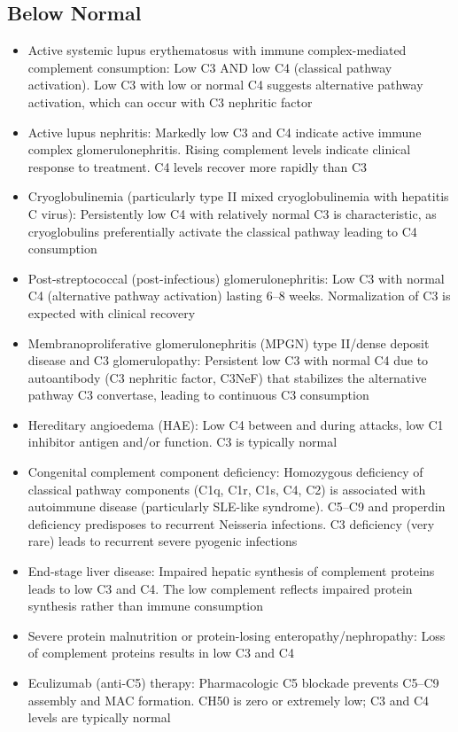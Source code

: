 \subsection*{Below Normal}
\begin{itemize}
  \item Active systemic lupus erythematosus with immune complex-mediated complement consumption: Low C3 AND low C4 (classical pathway activation). Low C3 with low or normal C4 suggests alternative pathway activation, which can occur with C3 nephritic factor
  \item Active lupus nephritis: Markedly low C3 and C4 indicate active immune complex glomerulonephritis. Rising complement levels indicate clinical response to treatment. C4 levels recover more rapidly than C3
  \item Cryoglobulinemia (particularly type II mixed cryoglobulinemia with hepatitis C virus): Persistently low C4 with relatively normal C3 is characteristic, as cryoglobulins preferentially activate the classical pathway leading to C4 consumption
  \item Post-streptococcal (post-infectious) glomerulonephritis: Low C3 with normal C4 (alternative pathway activation) lasting 6--8 weeks. Normalization of C3 is expected with clinical recovery
  \item Membranoproliferative glomerulonephritis (MPGN) type II/dense deposit disease and C3 glomerulopathy: Persistent low C3 with normal C4 due to autoantibody (C3 nephritic factor, C3NeF) that stabilizes the alternative pathway C3 convertase, leading to continuous C3 consumption
  \item Hereditary angioedema (HAE): Low C4 between and during attacks, low C1 inhibitor antigen and/or function. C3 is typically normal
  \item Congenital complement component deficiency: Homozygous deficiency of classical pathway components (C1q, C1r, C1s, C4, C2) is associated with autoimmune disease (particularly SLE-like syndrome). C5--C9 and properdin deficiency predisposes to recurrent Neisseria infections. C3 deficiency (very rare) leads to recurrent severe pyogenic infections
  \item End-stage liver disease: Impaired hepatic synthesis of complement proteins leads to low C3 and C4. The low complement reflects impaired protein synthesis rather than immune consumption
  \item Severe protein malnutrition or protein-losing enteropathy/nephropathy: Loss of complement proteins results in low C3 and C4
  \item Eculizumab (anti-C5) therapy: Pharmacologic C5 blockade prevents C5--C9 assembly and MAC formation. CH50 is zero or extremely low; C3 and C4 levels are typically normal
\end{itemize}

